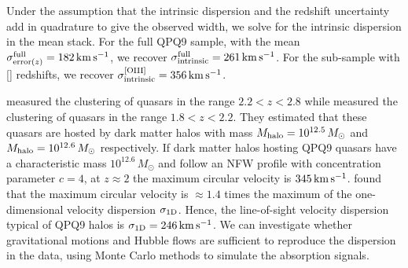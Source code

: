 \documentclass[iop]{emulateapj}
\begin{document}
Under the assumption that the intrinsic dispersion and the redshift uncertainty add in 
quadrature to give the observed width, we solve for the intrinsic dispersion in the  
mean stack. For the full QPQ9 sample, with the mean 
$\sigma_{{\rm error}(z)}^{\rm full}=182\,{\rm km\,s^{-1}}$, we recover 
$\sigma_{\rm intrinsic}^{\rm full}=261\,{\rm km\,s^{-1}}$. For the sub-sample with [] 
redshifts, we recover $\sigma_{\rm intrinsic}^{\rm [OIII]}=356\,{\rm km\,s^{-1}}$. 

\cite{Eftekharzadeh+15} measured the clustering of quasars in the range $2.2<z<2.8$ while 
\cite{RodriguezTorres+17} measured the clustering of quasars in the range $1.8<z<2.2$. They 
estimated that these quasars are hosted by dark matter halos with mass 
$M_{\rm halo}=10^{12.5}\,M_\odot$ and $M_{\rm halo}=10^{12.6}\,M_\odot$ respectively. If dark 
matter halos hosting QPQ9 quasars have a characteristic mass $10^{12.6}\,M_\odot$ and follow an 
NFW profile \citep{NavarroFrenkWhite97} with concentration 
parameter $c=4$, at $z\approx2$ the maximum circular velocity is $345\,{\rm km\,s^{-1}}$. 
\cite{TormenBouchetWhite97} found that the maximum circular velocity is $\approx1.4$ times the 
maximum of the one-dimensional velocity dispersion $\sigma_{\rm 1D}$. Hence, the line-of-sight 
velocity dispersion typical of QPQ9 halos is $\sigma_{\rm 1D}=246\,{\rm km\,s^{-1}}$. We can 
investigate whether gravitational motions and Hubble flows are sufficient to reproduce the 
dispersion in the data, using Monte Carlo methods to simulate the absorption signals. 
\end{document}
